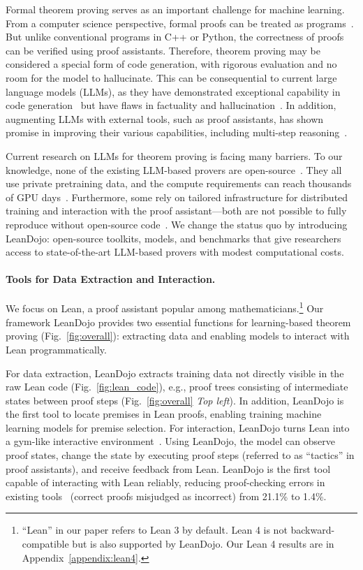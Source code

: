 \documentclass{article}
\newcommand{\smallsec}[1]{\vspace{-1mm} \paragraph{#1.}}
\begin{document}
Formal theorem proving serves as an important challenge for machine learning. From a computer science perspective, formal proofs can be treated as programs~\cite{howard1980formulae}. But unlike conventional programs in C++ or Python, the correctness of proofs can be verified using proof assistants. Therefore, theorem proving may be considered a special form of code generation, with rigorous evaluation and no room for the model to hallucinate. This can be consequential to current large language models (LLMs), as they have demonstrated exceptional capability in code generation~\cite{chen2021evaluating} but have flaws in factuality and hallucination~\cite{ji2023survey}. In addition, augmenting LLMs with external tools, such as proof assistants, has shown promise in improving their various capabilities, including multi-step reasoning~\cite{schick2023toolformer}.

Current research on LLMs for theorem proving is facing many barriers. To our knowledge, none of the existing LLM-based provers are open-source~\cite{polu2020generative,jiang2021lisa,han2022proof,lample2022hypertree,jiang2022thor,polu2023formal,first2023baldur,wang2023dt}. They all use private pretraining data, and the compute requirements can reach thousands of GPU days~\cite{lample2022hypertree}. Furthermore, some rely on tailored infrastructure for distributed training and interaction with the proof assistant---both are not possible to fully reproduce without open-source code~\cite{polu2023formal,lample2022hypertree}. We change the status quo by introducing LeanDojo: open-source toolkits, models, and benchmarks that give researchers access to state-of-the-art LLM-based provers with modest computational costs.


\smallsec{Tools for Data Extraction and Interaction}
We focus on Lean, a proof assistant popular among mathematicians.\footnote{``Lean'' in our paper refers to Lean 3 by default. Lean 4 is not backward-compatible but is also supported by LeanDojo. Our Lean 4 results are in Appendix~\ref{appendix:lean4}.} Our framework LeanDojo provides two essential functions for learning-based theorem proving (Fig.~\ref{fig:overall}): extracting data and enabling models to interact with Lean programmatically. 


For data extraction, LeanDojo extracts training data not directly visible in the raw Lean code (Fig.~\ref{fig:lean_code}), e.g., proof trees consisting of intermediate states between proof steps (Fig.~\ref{fig:overall} \emph{Top left}). In addition, LeanDojo is the first tool to locate premises in Lean proofs, enabling training machine learning models for premise selection. For interaction, LeanDojo turns Lean into a gym-like interactive environment~\cite{brockman2016openai}. Using LeanDojo, the model can observe proof states, change the state by executing proof steps (referred to as ``tactics'' in proof assistants), and receive feedback from Lean. LeanDojo is the first tool capable of interacting with Lean reliably, reducing proof-checking errors in existing tools~\cite{polu2023formal} (correct proofs misjudged as incorrect) from 21.1\% to 1.4\%. 
\end{document}
